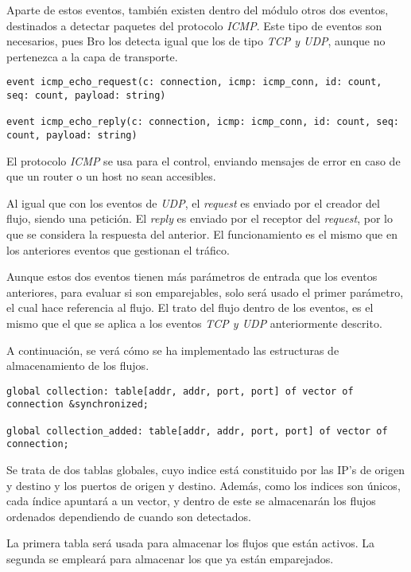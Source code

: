 \intro Aparte de estos eventos, también existen dentro del módulo otros dos eventos, destinados a detectar 
paquetes del protocolo \textit{ICMP}. Este tipo de eventos son necesarios, pues Bro los detecta igual que los 
de tipo \textit{TCP y UDP}, aunque no pertenezca a la capa de transporte.

\begin{lstlisting}[style=CodigoC]
event icmp_echo_request(c: connection, icmp: icmp_conn, id: count, seq: count, payload: string)

event icmp_echo_reply(c: connection, icmp: icmp_conn, id: count, seq: count, payload: string)
\end{lstlisting}

\intro El protocolo \textit{ICMP} se usa para el control, enviando mensajes de error en caso de que un router o un host 
no sean accesibles.

\intro Al igual que con los eventos de \textit{UDP}, el \textit{request} es enviado por el creador del flujo, 
siendo una petición. El \textit{reply} es enviado por el receptor del \textit{request}, por lo que se considera 
la respuesta del anterior. El funcionamiento es el mismo que en los anteriores eventos que gestionan el tráfico.

\intro Aunque estos dos eventos tienen más parámetros de entrada que los eventos anteriores, para evaluar si son emparejables, solo 
será usado el primer parámetro, el cual hace referencia al flujo. El trato del flujo dentro 
de los eventos, es el mismo que el que se aplica a los eventos \textit{TCP y UDP} anteriormente descrito.

\intro A continuación, se verá cómo se ha implementado las estructuras de almacenamiento de los flujos.

\begin{lstlisting}[style=CodigoC]
global collection: table[addr, addr, port, port] of vector of connection &synchronized;

global collection_added: table[addr, addr, port, port] of vector of connection;
\end{lstlisting}

\intro Se trata de dos tablas globales, cuyo indice está constituido por las IP's de origen y destino y los 
puertos de origen y destino. Además, como los indices son únicos, cada índice apuntará a un vector, y dentro de 
este se almacenarán los flujos ordenados dependiendo de cuando son detectados.

\intro La primera tabla será usada para almacenar los flujos que están activos. La segunda se empleará para almacenar los que ya están 
emparejados.

